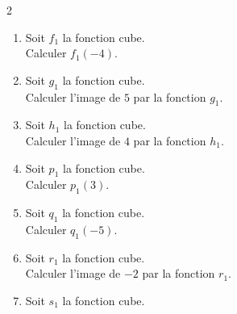 {%
\begin{Exercice}%
\leavevmode\vspace{-\baselineskip}
\begin{multicols}{2}
\begin{enumerate}[itemsep=1em]
	\item \begin{minipage}[t]{\linewidth}Soit $f_1$ la fonction cube.\\
      
      Calculer $f_1(-4)$.\end{minipage}
	\item \begin{minipage}[t]{\linewidth}Soit $g_1$ la fonction cube.\\
      
      Calculer l'image de $5$ par la fonction $g_1$.\end{minipage}
	\item \begin{minipage}[t]{\linewidth}Soit $h_1$ la fonction cube.\\
      
      Calculer l'image de $4$ par la fonction $h_1$.\end{minipage}
	\item \begin{minipage}[t]{\linewidth}Soit $p_1$ la fonction cube.\\
      
      Calculer $p_1(3)$.\end{minipage}
	\item \begin{minipage}[t]{\linewidth}Soit $q_1$ la fonction cube.\\
      
      Calculer $q_1(-5)$.\end{minipage}
	\item \begin{minipage}[t]{\linewidth}Soit $r_1$ la fonction cube.\\
      
      Calculer l'image de $-2$ par la fonction $r_1$.\end{minipage}
	\item \begin{minipage}[t]{\linewidth}Soit $s_1$ la fonction cube.\\
      

\end{minipage}
\end{enumerate}
\end{multicols}
\end{Exercice}}

